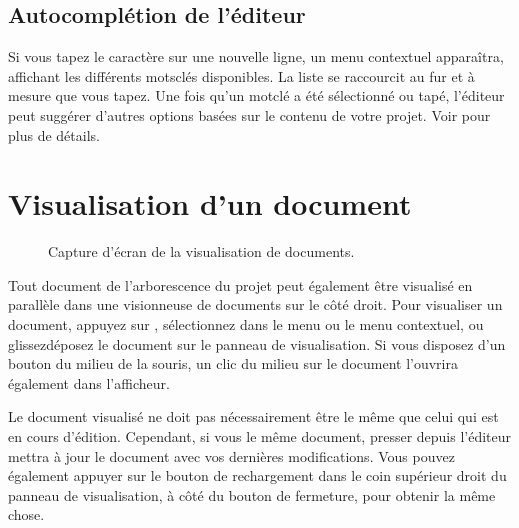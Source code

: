 \documentclass[a4paper,11pt,french]{sphinxmanual}
\begin{document}
\subsection{Auto\sphinxhyphen{}complétion de l’éditeur}
\label{\detokenize{usage_writing:editor-auto-completer}}
\sphinxAtStartPar
Si vous tapez le caractère  sur une nouvelle ligne, un menu contextuel apparaîtra, affichant les différents mots\sphinxhyphen{}clés disponibles. La liste se raccourcit au fur et à mesure que vous tapez. Une fois qu’un mot\sphinxhyphen{}clé a été sélectionné ou tapé, l’éditeur peut suggérer d’autres options basées sur le contenu de votre projet. Voir {\hyperref[\detokenize{project_references:a-references-completer}]{}} pour plus de détails.

\sphinxAtStartPar
{}


\section{Visualisation d’un document}
\label{\detokenize{usage_writing:viewing-a-document}}\label{\detokenize{usage_writing:a-ui-view}}
\begin{figure}[htbp]
\centering
\capstart

\noindent{}
\caption{Capture d’écran de la visualisation de documents.}\label{\detokenize{usage_writing:id2}}\end{figure}

\sphinxAtStartPar
Tout document de l’arborescence du projet peut également être visualisé en parallèle dans une visionneuse de documents sur le côté droit. Pour visualiser un document, appuyez sur , sélectionnez  dans le menu ou le menu contextuel, ou glissez\sphinxhyphen{}déposez le document sur le panneau de visualisation. Si vous disposez d’un bouton du milieu de la souris, un clic du milieu sur le document l’ouvrira également dans l’afficheur.

\sphinxAtStartPar
Le document visualisé ne doit pas nécessairement être le même que celui qui est en cours d’édition. Cependant, si vous  le même document, presser  depuis l’éditeur mettra à jour le document avec vos dernières modifications. Vous pouvez également appuyer sur le bouton de rechargement dans le coin supérieur droit du panneau de visualisation, à côté du bouton de fermeture, pour obtenir la même chose.
\end{document}
